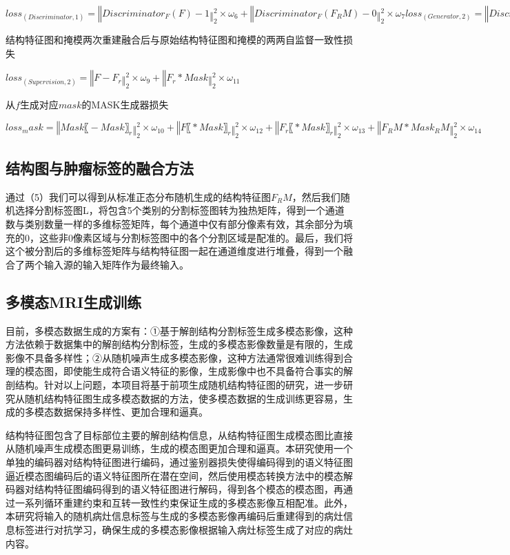 \documentclass[letterpaper]{article} %
\begin{document}
$loss_(Discriminator,1)=‖Discriminator_F (F)-1‖_2^2×ω_6+‖Discriminator_F (F_RM )-0‖_2^2×ω_7
loss_(Generator,2)=‖Discriminator_F (F_RM )-1‖_2^2×ω_8$

结构特征图和掩模两次重建融合后与原始结构特征图和掩模的两两自监督一致性损失

$loss_(Supervision,2)=‖F-F_r ‖_2^2×ω_9+‖F_r*Mask‖_2^2×ω_11$

从$f$生成对应$mask$的MASK生成器损失

$loss_mask=‖Mask〖-Mask〗_r ‖_2^2×ω_10+‖F〖*Mask〗_r ‖_2^2×ω_12+‖F_r 〖*Mask〗_r ‖_2^2×ω_13+‖F_RM*Mask_RM ‖_2^2×ω_14$

\subsection{结构图与肿瘤标签的融合方法}
通过（5）我们可以得到从标准正态分布随机生成的结构特征图$F_RM$，然后我们随机选择分割标签图L，将包含5个类别的分割标签图转为独热矩阵，得到一个通道数与类别数量一样的多维标签矩阵，每个通道中仅有部分像素有效，其余部分为填充的0，这些非0像素区域与分割标签图中的各个分割区域是配准的。最后，我们将这个被分割后的多维标签矩阵与结构特征图一起在通道维度进行堆叠，得到一个融合了两个输入源的输入矩阵作为最终输入。

\subsection{多模态MRI生成训练}
目前，多模态数据生成的方案有：①基于解剖结构分割标签生成多模态影像，这种方法依赖于数据集中的解剖结构分割标签，生成的多模态影像数量是有限的，生成影像不具备多样性；②从随机噪声生成多模态影像，这种方法通常很难训练得到合理的模态图，即使能生成符合语义特征的影像，生成影像中也不具备符合事实的解剖结构。针对以上问题，本项目将基于前项生成随机结构特征图的研究，进一步研究从随机结构特征图生成多模态数据的方法，使多模态数据的生成训练更容易，生成的多模态数据保持多样性、更加合理和逼真。

结构特征图包含了目标部位主要的解剖结构信息，从结构特征图生成模态图比直接从随机噪声生成模态图更易训练，生成的模态图更加合理和逼真。本研究使用一个单独的编码器对结构特征图进行编码，通过鉴别器损失使得编码得到的语义特征图逼近模态图编码后的语义特征图所在潜在空间，然后使用模态转换方法中的模态解码器对结构特征图编码得到的语义特征图进行解码，得到各个模态的模态图，再通过一系列循环重建约束和互转一致性约束保证生成的多模态影像互相配准。此外，本研究将输入的随机病灶信息标签与生成的多模态影像再编码后重建得到的病灶信息标签进行对抗学习，确保生成的多模态影像根据输入病灶标签生成了对应的病灶内容。
\end{document}
